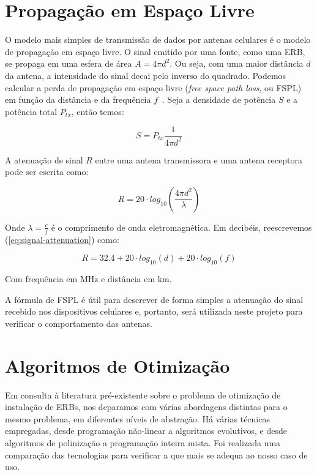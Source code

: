 \documentclass[]{politex}
\begin{document}
\section{Propagação em Espaço Livre}

O modelo mais simples de transmissão de dados por antenas celulares é o modelo
de propagação em espaço livre. O sinal emitido por uma fonte, como uma ERB, se
propaga em uma esfera de área $A = 4\pi d^2$. Ou seja, com uma maior distância
$d$ da antena, a intensidade do sinal decai pelo inverso do quadrado. Podemos
calcular a perda de propagação em espaço livre (\textit{free space path loss},
ou FSPL) em função da distância e da frequência $f$~\cite{rf-design}. Seja a
densidade de potência $S$ e a potência total $P_{tx}$, então temos:

\begin{equation}
    S = P_{tx} \frac{1}{4\pi d^2}
\end{equation}

A atenuação de sinal $R$ entre uma antena transmissora e uma antena receptora
pode ser escrita como:

\begin{equation}\label{eq:signal-attenuation}
    R = 20\cdot log_{10} \left( \frac{4\pi d^2}{\lambda} \right)
\end{equation}

Onde $\lambda = \frac{c}{f}$ é o comprimento de onda eletromagnética. Em
decibéis, reescrevemos (\ref{eq:signal-attenuation}) como:

\begin{equation}
    R = 32.4 + 20\cdot log_{10}(d) + 20\cdot log_{10}(f)
\end{equation}

Com frequência em MHz e distância em km.

A fórmula de FSPL é útil para descrever de forma simples a atenuação do sinal
recebido nos dispositivos celulares e, portanto, será utilizada neste projeto
para verificar o comportamento das antenas.

\section{Algoritmos de Otimização}

Em consulta à literatura pré-existente sobre o problema de otimização de
instalação de ERBs, nos deparamos com várias abordagens distintas para o mesmo
problema, em diferentes níveis de abstração. Há várias técnicas empregadas,
desde programação não-linear a algoritmos evolutivos, e desde algoritmos de
polinização a programação inteira mista. Foi realizada uma comparação das
tecnologias para verificar a que mais se adequa ao nosso caso de uso.
\end{document}
